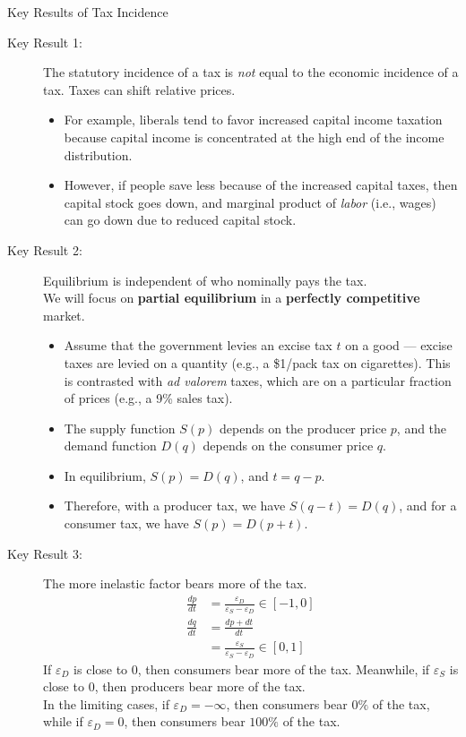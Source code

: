 \documentclass[8pt]{extarticle}
\begin{document}
  \begin{problem}{Key Results of Tax Incidence}
    \begin{description}
      \item[Key Result 1:] The statutory incidence of a tax is \textit{not} equal to the economic incidence of a tax. Taxes can shift relative prices.
        \begin{itemize}
          \item For example, liberals tend to favor increased capital income taxation because capital income is concentrated at the high end of the income distribution.
          \item However, if people save less because of the increased capital taxes, then capital stock goes down, and marginal product of \textit{labor} (i.e., wages) can go down due to reduced capital stock.
        \end{itemize}
      \item[Key Result 2:] Equilibrium is independent of who nominally pays the tax.\\

        We will focus on \textbf{partial equilibrium} in a \textbf{perfectly competitive} market.
        \begin{itemize}
          \item Assume that the government levies an excise tax $t$ on a good --- excise taxes are levied on a quantity (e.g., a \$1/pack tax on cigarettes). This is contrasted with \textit{ad valorem} taxes, which are on a particular fraction of prices (e.g., a 9\% sales tax).
          \item The supply function $S(p)$ depends on the producer price $p$, and the demand function $D(q)$ depends on the consumer price $q$.
          \item In equilibrium, $S(p) = D(q)$, and $t = q-p$.
          \item Therefore, with a producer tax, we have $S(q-t) = D(q)$, and for a consumer tax, we have $S(p) = D(p+t)$.
        \end{itemize}
      \item[Key Result 3:] The more inelastic factor bears more of the tax.
        \begin{align*}
          \frac{dp}{dt} &= \frac{\varepsilon_D}{\varepsilon_S - \varepsilon_D} \in [-1,0]\\
          \frac{dq}{dt} &= \frac{dp + dt}{dt}\\
                        &= \frac{\varepsilon_S}{\varepsilon_S - \varepsilon_D} \in [0,1]
        \end{align*}
        If $\varepsilon_D$ is close to $0$, then consumers bear more of the tax. Meanwhile, if $\varepsilon_S$ is close to $0$, then producers bear more of the tax.\\

        In the limiting cases, if $\varepsilon_D = -\infty$, then consumers bear $0\%$ of the tax, while if $\varepsilon_D = 0$, then consumers bear $100\%$ of the tax.
    \end{description}
  \end{problem}
\end{document}
